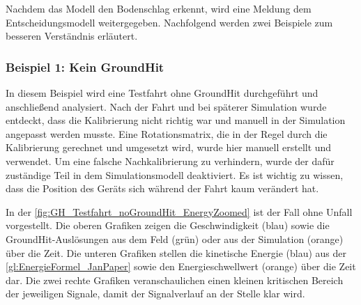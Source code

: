Nachdem das Modell den Bodenschlag erkennt, wird eine Meldung dem Entscheidungsmodell weitergegeben. Nachfolgend werden zwei Beispiele zum besseren Verständnis erläutert.

\subsubsection{Beispiel 1: Kein GroundHit}
In diesem Beispiel wird eine Testfahrt ohne GroundHit durchgeführt und anschließend analysiert. Nach der Fahrt und bei späterer Simulation wurde entdeckt, dass die Kalibrierung nicht richtig war und manuell in der Simulation angepasst werden musste. Eine Rotationsmatrix, die in der Regel durch die Kalibrierung gerechnet und umgesetzt wird, wurde hier manuell erstellt und verwendet. Um eine falsche Nachkalibrierung zu verhindern, wurde der dafür zuständige Teil in dem Simulationsmodell deaktiviert. Es ist wichtig zu wissen, dass die Position des Geräts sich während der Fahrt kaum verändert hat.



In der \autoref{fig:GH_Testfahrt_noGroundHit_EnergyZoomed} ist der Fall ohne Unfall vorgestellt.
Die oberen Grafiken zeigen die Geschwindigkeit (blau) sowie die GroundHit-Auslösungen aus dem Feld (grün) oder aus der Simulation (orange) über die Zeit.
Die unteren Grafiken stellen die kinetische Energie (blau) aus der \autoref{gl:EnergieFormel_JanPaper} sowie den Energieschwellwert (orange) über die Zeit dar.
Die zwei rechte Grafiken veranschaulichen einen kleinen kritischen Bereich der jeweiligen Signale, damit der Signalverlauf an der Stelle klar wird.


